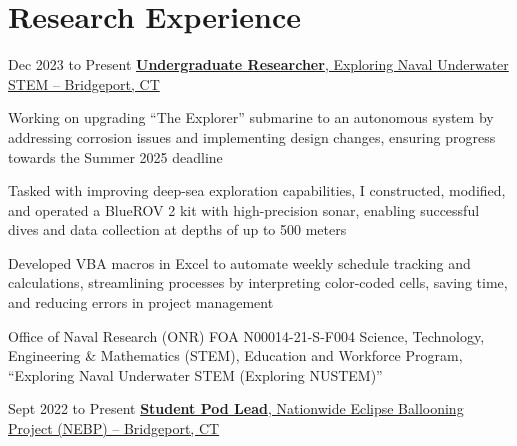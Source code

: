 \section{Research Experience}
    \begin{twocolentry}{
        Dec 2023 to Present
    }
        \href{https://nustem.bridgeport.edu/}{\textbf{Undergraduate Researcher}, Exploring Naval Underwater STEM -- Bridgeport, CT}
    \end{twocolentry}

    \vspace{0.10 cm}
    \begin{onecolentry}
        \begin{highlights}
            \item Working on upgrading “The Explorer” submarine to an autonomous system by addressing corrosion issues and implementing design changes, ensuring progress towards the Summer 2025 deadline
            \item Tasked with improving deep-sea exploration capabilities, I constructed, modified, and operated a BlueROV 2 kit with high-precision sonar, enabling successful dives and data collection at depths of up to 500 meters
            \item Developed VBA macros in Excel to automate weekly schedule tracking and calculations, streamlining processes by interpreting color-coded cells, saving time, and reducing errors in project management
            \item Office of Naval Research (ONR) FOA N00014-21-S-F004 Science, Technology, Engineering \& Mathematics (STEM), Education and Workforce Program, “Exploring Naval Underwater STEM (Exploring NUSTEM)”
        \end{highlights}
    \end{onecolentry}

    \vspace{0.2 cm}

    \begin{twocolentry}{
        Sept 2022 to Present
    }
        \href{http://eclipse.montana.edu/}{\textbf{Student Pod Lead}, Nationwide Eclipse Ballooning Project (NEBP) -- Bridgeport, CT}
    \end{twocolentry}

